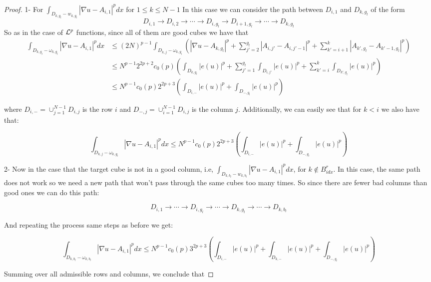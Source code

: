 \begin{proof}
    1- For $\int_{D_{k,g_l}-w_{k,g_l}}|\nabla u- A_{i,1}|^p d x$ for $1\leq k\leq N-1$ In this case we can consider the path between $D_{i,1}$ and $D_{k,g_l}$ of the form
    $$D_{i,1}\to D_{i,2}\to\cdots\to D_{i,g_l}\to D_{i+1,g_l}\to\cdots\to D_{k,g_l}$$
    So as in the case of ${\mathcal L}^p$ functions, since all of them are good cubes we have that 
    \begin{align*}
        \int_{D_{k,g_l}-\omega_{k,g_l}}|\nabla u- A_{i,1}|^p d x &\leq (2N)^{p-1}\int_{D_{k,j}-\omega_{k,g_l}} \left(|\nabla u-A_{k,g_l}|^p + \sum_{j'=2}^{g_l} |A_{i,j'}-A_{i, j'-1}|^p+\sum_{k'=i+1}^k |A_{k',g_l}-A_{k'-1, g_l}|^p\right)\\
    &\leq N^{p-1}2^{2p+2}c_0(p)(\int_{D_{k,g_l}}|e(u)|^p +  \sum_{j'=1}^{g_l} \int_{D_{i,j'}}|e(u)|^p+\sum_{k'=i}^k\int_{D_{k',g_l}}|e(u)|^p)\\
    &\leq N^{p-1}c_0(p) 2^{2p+3}  \left(\int_{D_{i,-}}|e(u)|^p+\int_{D_{-,g_l}}|e(u)|^p\right)
    \end{align*}
    
    where $D_{i,-}=\cup_{j=1}^{N-1} D_{i,j}$ is the row $i$ and $D_{-,j}=\cup_{i=1}^{N-1} D_{i,j}$ is the column $j$. Additionally, we can easily see that for  $k<i$ we also have that:
    
    $$\int_{D_{k,j}-\omega_{k,g_l}}|\nabla u- A_{i,1}|^p d x\leq N^{p-1}c_0(p) 2^{2p+3}  \left(\int_{D_{i,-}}|e(u)|^p+\int_{D_{-,g_l}}|e(u)|^p\right)$$
    
    2- Now in the case that the target cube is not in a good column, i.e, $\int_{D_{k,b_l}-w_{k,b_l}}|\nabla u- A_{i,1}|^p d x$, for $k\notin 
    B^r_{idx}$. In this case, the same path does not work so we need a new path that won't pass through the same cubes too many times. So since there are fewer bad columns than good ones we can do this path:
    
    $$D_{i,1}\to\cdots\to D_{i,g_l}\to\cdots\to D_{k,g_l}\to\cdots\to D_{k,b_l}$$
    
    And repeating the process same steps as before we get:
    
    $$\int_{D_{k,b_l}-\omega_{k,b_l}}|\nabla u- A_{i,1}|^p d x\leq N^{p-1}c_0(p) 3^{2p+3}  \left(\int_{D_{i,-}}|e(u)|^p+\int_{D_{k,-}}|e(u)|^p+\int_{D_{-,g_l}}|e(u)|^p\right)$$
    
    
    Summing over all admissible rows and columns, we conclude that
    

\end{proof}
